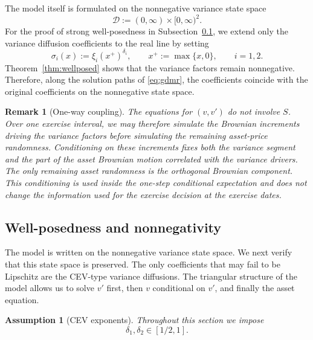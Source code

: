 \documentclass[pdflatex,sn-mathphys-num]{sn-jnl}
\theoremstyle{thmstyleone}%
\theoremstyle{thmstylethree}%
\newtheorem{assumption}[theorem]{Assumption}
\theoremstyle{thmstyletwo}%
\newtheorem{remark}[theorem]{Remark}
\begin{document}

The model itself is formulated on the nonnegative variance state space
$$
\mathcal D:=(0,\infty)\times[0,\infty)^2.
$$
For the proof of strong well-posedness in Subsection~\ref{sec:wellposed}, we
extend only the variance diffusion coefficients to the real line by setting
$$
\sigma_i(x):=\xi_i(x^+)^{\delta_i},\qquad
x^+:=\max\{x,0\},\qquad i=1,2.
$$
Theorem~\ref{thm:wellposed} shows that the variance factors remain
nonnegative. Therefore, along the solution paths of \eqref{eq:gdmr}, the
coefficients coincide with the original coefficients on the nonnegative state
space.

\begin{remark}[One-way coupling]\label{rem:one-way}
The equations for $(v,v')$ do not involve $S$. Over one exercise interval, we
may therefore simulate the Brownian increments driving the variance factors
before simulating the remaining asset-price randomness. Conditioning on these increments
fixes both the variance segment and the part of the asset Brownian motion
correlated with the variance drivers. The only remaining asset randomness is
the orthogonal Brownian component. This conditioning is used inside the
one-step conditional expectation and does not change the information used for
the exercise decision at the exercise dates.
\end{remark}




\subsection{Well-posedness and nonnegativity}\label{sec:wellposed}

The model is written on the nonnegative variance state space. We next verify
that this state space is preserved. The only coefficients that may fail to be
Lipschitz are the CEV-type variance diffusions. The triangular structure of the
model allows us to
solve $v'$ first, then $v$ conditional on $v'$, and finally the asset equation.

\begin{assumption}[CEV exponents]\label{ass:delta-range}
Throughout this section we impose
$$
\delta_1,\delta_2\in[1/2,1].
$$
\end{assumption}
\end{document}
